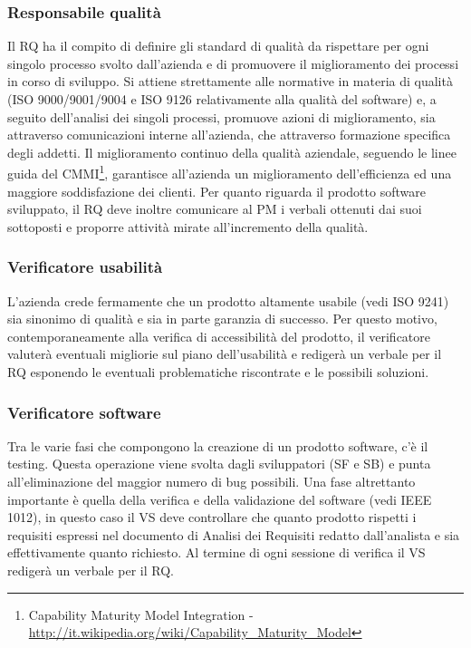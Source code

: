 \subsubsection{Responsabile qualit\`{a}}
Il RQ ha il compito di definire gli standard di qualit\`{a} da rispettare per ogni singolo processo
svolto dall\textquoteright{}azienda e di promuovere il miglioramento dei processi in corso di sviluppo.
Si attiene strettamente alle normative in materia di qualit\`{a} (ISO 9000/9001/9004
e ISO 9126 relativamente alla qualit\`{a} del software) e, a seguito dell\textquoteright{}analisi dei singoli
processi, promuove azioni di miglioramento, sia attraverso comunicazioni interne all\textquoteright{}azienda,
che attraverso formazione specifica degli addetti. Il miglioramento continuo
della qualit\`{a} aziendale, seguendo le linee guida del CMMI\footnote{Capability Maturity Model Integration - \url{http://it.wikipedia.org/wiki/Capability\_Maturity\_Model}}, garantisce all\textquoteright{}azienda un
miglioramento dell\textquoteright{}efficienza ed una maggiore soddisfazione dei clienti. Per quanto riguarda
il prodotto software sviluppato, il RQ deve inoltre comunicare al PM i verbali
ottenuti dai suoi sottoposti e proporre attivit\`{a} mirate all\textquoteright{}incremento della qualit\`{a}.

\subsubsection{Verificatore usabilit\`{a}}
L\textquoteright{}azienda crede fermamente che un prodotto altamente usabile (vedi ISO 9241) sia
sinonimo di qualit\`{a} e sia in parte garanzia di successo. Per questo motivo, contemporaneamente
alla verifica di accessibilit\`{a} del prodotto, il verificatore valuter\`{a} eventuali
migliorie sul piano dell\textquoteright{}usabilit\`{a} e rediger\`{a} un verbale per il RQ esponendo le eventuali problematiche riscontrate e le possibili soluzioni.

\subsubsection{Verificatore software}
Tra le varie fasi che compongono la creazione di un prodotto software, c\textquoteright{}\`{e} il testing.
Questa operazione viene svolta dagli sviluppatori (SF e SB) e punta all\textquoteright{}eliminazione del
maggior numero di bug possibili. Una fase altrettanto importante \`{e} quella della verifica
e della validazione del software (vedi IEEE 1012), in questo caso il VS deve controllare
che quanto prodotto rispetti i requisiti espressi nel documento di Analisi dei Requisiti
redatto dall\textquoteright{}analista e sia effettivamente quanto richiesto. Al termine di ogni sessione di verifica il VS rediger\`{a} un verbale per il RQ.

